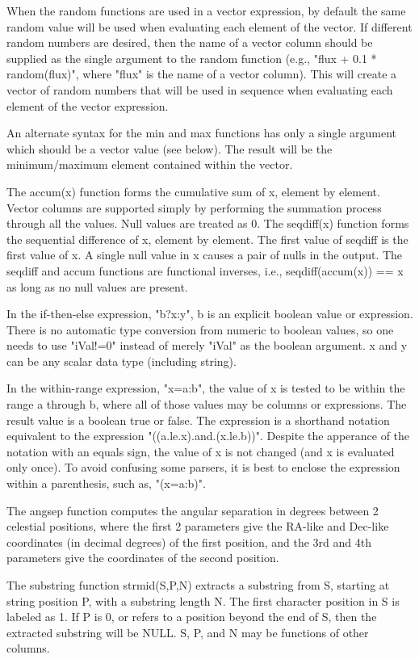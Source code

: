 \documentclass[11pt]{book}
\begin{document}
When the random functions are used in a vector expression, by default
the same random value will be used when evaluating each element of the
vector.  If different random numbers are desired, then the name of a
vector column should be supplied as the single argument to the random
function (e.g., "flux + 0.1 * random(flux)", where "flux" is the name
of a vector column).  This will create a vector of random numbers that
will be used in sequence when evaluating each element of the vector
expression.

An alternate syntax for the min and max functions  has only a single
argument which  should be  a  vector value (see  below).  The result
will be the minimum/maximum element contained within the vector.

The accum(x) function forms the cumulative sum of x, element by
element.  Vector columns are supported simply by performing the
summation process through all the values.  Null values are treated as
0.  The seqdiff(x) function forms the sequential difference of x,
element by element.  The first value of seqdiff is the first value of
x.  A single null value in x causes a pair of nulls in the output.
The seqdiff and accum functions are functional inverses, i.e.,
seqdiff(accum(x)) == x as long as no null values are present.

In the if-then-else expression, "b?x:y", b is an explicit boolean
value or expression.  There is no automatic type conversion from
numeric to boolean values, so one needs to use "iVal!=0" instead of
merely "iVal" as the boolean argument. x and y can be any scalar data
type (including string).

In the within-range expression, "x=a:b", the value of x is tested to
be within the range a through b, where all of those values may be
columns or expressions.  The result value is a boolean true or false.
The expression is a shorthand notation equivalent to the expression
"((a.le.x).and.(x.le.b))".  Despite the apperance of the notation with
an equals sign, the value of x is not changed (and x is evaluated only
once).  To avoid confusing some parsers, it is best to enclose the
expression within a parenthesis, such as, "(x=a:b)".

The angsep function computes the angular separation in degrees between
2 celestial positions, where the first 2 parameters give the RA-like
and Dec-like coordinates (in decimal degrees) of the first position,
and the 3rd and 4th parameters give the coordinates of the second
position.

The substring function strmid(S,P,N) extracts a substring from S,
starting at string position P, with a substring length N.  The first
character position in S is labeled as 1. If P is 0, or refers to a
position beyond the end of S, then the extracted substring will be
NULL.  S, P, and N may be functions of other columns.
\end{document}
